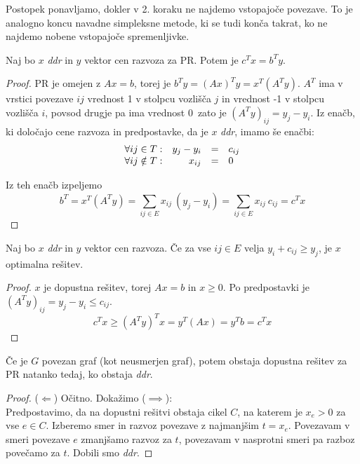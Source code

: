\documentclass[11pt, a4paper]{article}
\begin{document}
    Postopek ponavljamo, dokler v 2. koraku ne najdemo vstopajoče povezave. To je analogno koncu navadne simpleksne metode, ki se tudi konča takrat, ko ne najdemo nobene vstopajoče spremenljivke.

    \begin{proposition}
        Naj bo \(x\) \textit{ddr} in \(y\) vektor cen razvoza za PR. Potem je \(c^T x = b^T y\). 
    \end{proposition}

    \begin{proof}
        PR je omejen z \(Ax=b\), torej je \(b^T y = (Ax)^T y = x^T (A^T y)\). \(A^T\) ima v vrstici povezave \(ij\) vrednost 1 v stolpcu vozlišča \(j\) in vrednost -1 v stolpcu vozlišča \(i\), povsod drugje pa ima vrednost 0\, zato je \((A^T y)_{ij}=y_j-y_i\). Iz enačb, ki določajo cene razvoza in predpostavke, da je \(x\) \textit{ddr}, imamo še enačbi:
        \[
            \begin{array}{l r c l}
                \forall ij \in T: & y_j - y_i & = & c_{ij} \\
                \forall ij \notin T: &  x_{ij} & = & 0   
            \end{array}
        \]
        
        Iz teh enačb izpeljemo
        \[
            b^T = x^T (A^T y) = \sum_{ij \in E} x_{ij}\ (y_j - y_i) = \sum_{ij \in E} x_{ij}\ c_{ij} = c^T x    
        \]
    \end{proof}

    \begin{proposition}
        Naj bo \(x\) \textit{ddr} in \(y\) vektor cen razvoza. Če za vse \(ij \in E\) velja \(y_i + c_{ij} \ge y_j\), je \(x\) optimalna rešitev.
    \end{proposition}

    \begin{proof}
        \(x\) je dopustna rešitev, torej \(Ax = b\) in \(x \ge 0\). Po predpostavki je \((A^T y)_{ij} = y_j - y_i \le c_{ij}\).
        \[
            c^T x \ge (A^T y)^T x = y^T (Ax) = y^T b = c^T x     
        \]
    \end{proof}

    \begin{proposition}
        Če je \(G\) povezan graf (kot neusmerjen graf), potem obstaja dopustna rešitev za PR natanko tedaj, ko obstaja \textit{ddr}.
    \end{proposition}

    \begin{proof}
        (\(\Longleftarrow\)) Očitno. Dokažimo (\(\implies\)): \\
        Predpostavimo, da na dopustni rešitvi obstaja cikel \(C\), na katerem je \(x_e > 0\) za vse \(e \in C\). Izberemo smer in razvoz povezave z najmanjšim \(t = x_e\). Povezavam v smeri povezave \(e\) zmanjšamo razvoz za \(t\), povezavam v nasprotni smeri pa razboz povečamo za \(t\). Dobili smo \textit{ddr}.
    \end{proof}
\end{document}
